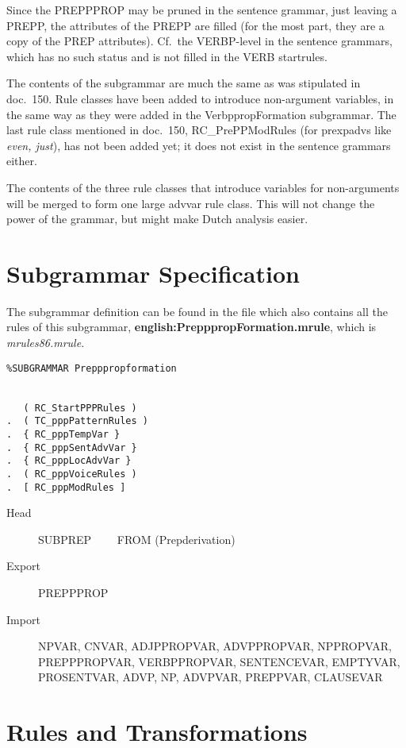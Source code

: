 Since the PREPPPROP may be pruned in the sentence grammar, just leaving a 
PREPP, the attributes of the PREPP are filled (for the most part, they are a 
copy of the PREP attributes). Cf.\ the VERBP-level in the sentence grammars, 
which has no such status and is not filled in the VERB startrules.

The contents of the subgrammar are much the same as was stipulated in doc.\ 
150. Rule classes have been added to introduce non-argument variables, in the 
same way as they were added in the VerbppropFormation subgrammar. The last rule 
class mentioned in doc.\ 150, RC\_PrePPModRules (for prexpadvs like {\em even, 
just\/}), has not been added yet; it does not exist in the sentence grammars 
either.

The contents of the three rule classes that introduce variables for 
non-arguments will be merged to form one large advvar rule class. This will not 
change the power of the grammar, but might make Dutch analysis easier.

\section{Subgrammar Specification}
The subgrammar definition can be found in the file which also contains all the 
rules of this subgrammar, {\bf english:PrepppropFormation.mrule}, 
which is {\em mrules86.mrule\/}.

\begin{verbatim}
%SUBGRAMMAR Prepppropformation


   ( RC_StartPPPRules )
.  ( TC_pppPatternRules )
.  { RC_pppTempVar }
.  { RC_pppSentAdvVar }
.  { RC_pppLocAdvVar }
.  ( RC_pppVoiceRules )
.  [ RC_pppModRules ]

\end{verbatim}

\begin{description}
  \item[Head]  SUBPREP  \ \ \ \ FROM (Prepderivation)
  \item[Export] PREPPPROP
  \item[Import] NPVAR, CNVAR, ADJPPROPVAR, ADVPPROPVAR, NPPROPVAR, 
PREPPPROPVAR, VERBPPROPVAR, SENTENCEVAR, EMPTYVAR, PROSENTVAR, ADVP, NP,
ADVPVAR, PREPPVAR, CLAUSEVAR
\end{description}

\newpage
\section{Rules and Transformations}

